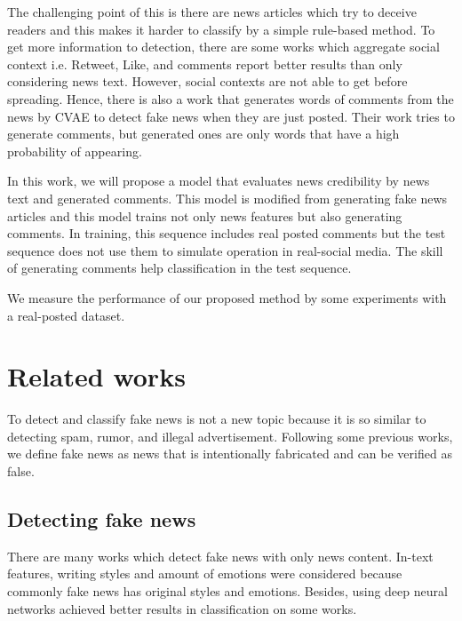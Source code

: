 \documentclass[conference]{IEEEtran}
\begin{document}
The challenging point of this is there are news articles which try to deceive readers
and this makes it harder to classify by a simple rule-based method.
To get more information to detection,
there are some works which aggregate social context i.e. Retweet, Like, and comments
report better results than only considering news text\cite{Guo:2018:RDH:3269206.3271709}.
However, social contexts are not able to get before spreading.
Hence, there is also a work that generates words of comments from the news by CVAE to detect fake news when they are just posted\cite{ijcai2018-533}.
Their work tries to generate comments, but generated ones are only words that have a high probability of appearing.

In this work, we will propose a model that evaluates news credibility by news text and generated comments.
This model is modified from generating fake news articles\cite{NIPS2019_9106} and this model trains not only news features but also generating comments.
In training, this sequence includes real posted comments but the test sequence does not use them to simulate operation in real-social media.
The skill of generating comments help classification in the test sequence.

We measure the performance of our proposed method by some experiments with a real-posted dataset.

\section{Related works}
To detect and classify fake news is not a new topic because it is so similar to detecting spam\cite{shen2017discovering}, rumor\cite{7023340}, and illegal advertisement\cite{Huang:2017:DFO:3041021.3054233}.
Following some previous works\cite{Shu:2017:FND:3137597.3137600,Ruchansky:2017:CHD:3132847.3132877,Wang:2018:EEA:3219819.3219903}, we define fake news as news that is intentionally fabricated and can be verified as false.

\subsection{Detecting fake news}
There are many works which detect fake news with only news content.
In-text features, writing styles\cite{DBLP:journals/corr/PotthastKRBS17} and amount of emotions\cite{DBLP:journals/corr/abs-1903-01728}
were considered because commonly fake news has original styles and emotions.
Besides, using deep neural networks achieved better results in classification on some works\cite{wang-2017-liar,karimi-tang-2019-learning,karimi-etal-2018-multi}.
\end{document}
